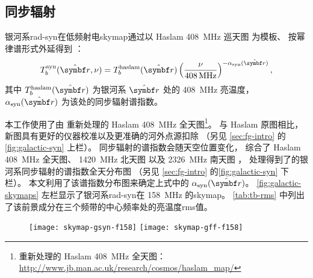 \subsection{同步辐射}

银河系\ac{rad-syn}在低频射电\ac{skymap}通过以
Haslam \SI{408}{\MHz} 巡天图\cite{haslam1982} 为模板、
按幂律谱形式外延得到 \cite{wang2010,bonaldi2015}：
\begin{equation}
  T_b^{\R{syn}}(\hat{\B{r}}, \nu)
    = T_b^{\R{haslam}}(\hat{\B{r}}) \left( \frac{\nu}{\SI{408}{\MHz}}
      \right)^{-\alpha_{\R{syn}}(\hat{\B{r}})} ,
\end{equation}
其中 $T_b^{\R{haslam}}(\hat{\B{r}})$ 为银河系 $\hat{\B{r}}$ 处的
\SI{408}{\MHz} 亮温度，
$\alpha_{\R{syn}}(\hat{\B{r}})$ 为该处的同步辐射谱指数。

本工作使用了由  重新处理的 Haslam \SI{408}{\MHz}
全天图\footnote{%
  重新处理的 Haslam \SI{408}{\MHz} 全天图：
  \url{http://www.jb.man.ac.uk/research/cosmos/haslam_map/}}。
与 Haslam 原图相比，新图具有更好的仪器校准以及更准确的河外点源扣除
\cite{remazeilles2015}
（另见 \autoref{sec:fg-intro} 的\autoref{fig:galactic-syn} 上栏）。
同步辐射的谱指数会随天空位置变化，
 综合了 Haslam \SI{408}{\MHz} 全天图、
\SI{1420}{\MHz} 北天图 \cite{reich1986}
以及 \SI{2326}{\MHz} 南天图 \cite{jonas1998}，
处理得到了的银河系同步辐射的谱指数全天分布图
（另见 \autoref{sec:fg-intro} 的\autoref{fig:galactic-syn} 下栏）。
本文利用了该谱指数分布图来确定上式中的 $\alpha_{\R{syn}}(\hat{\B{r}})$。
\autoref{fig:galactic-skymaps} 左栏显示了银河系\ac{rad-syn}在
\SI{158}{\MHz} 的\ac{skymap}。
\autoref{tab:tb-rms} 中列出了该前景成分在三个频带的中心频率处的亮温度\ac{rms}值。

\begin{figure}[htp]
  \centering
  \texttt{[image: skymap-gsyn-f158]}%
  \hfill
  \texttt{[image: skymap-gff-f158]}
  \label{fig:galactic-skymaps}
\end{figure}


